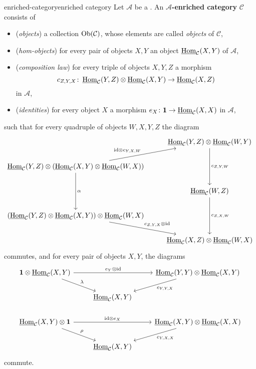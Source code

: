 \begin{topic}{enriched-category}{enriched category}
    Let $\mathcal{A}$ be a . An \textbf{$\mathcal{A}$-enriched category} $\mathcal{C}$ consists of
    \begin{itemize}
        \item (\textit{objects}) a collection $\textup{Ob}(\mathcal{C})$, whose elements are called \textit{objects} of $\mathcal{C}$,
        \item (\textit{hom-objects}) for every pair of objects $X, Y$ an object $\operatorname{\underline{Hom}}_\mathcal{C}(X, Y)$ of $\mathcal{A}$,
        \item (\textit{composition law}) for every triple of objects $X, Y, Z$ a morphism
        \[ c_{Z, Y, X} \colon \operatorname{\underline{Hom}}_\mathcal{C}(Y, Z) \otimes \operatorname{\underline{Hom}}_\mathcal{C}(X, Y) \to \operatorname{\underline{Hom}}_\mathcal{C}(X, Z) \]
        in $\mathcal{A}$,
        \item (\textit{identities}) for every object $X$ a morphism $e_X \colon \textbf{1} \to \operatorname{\underline{Hom}}_\mathcal{C}(X, X)$ in $\mathcal{A}$,
    \end{itemize}
    such that for every quadruple of objects $W, X, Y, Z$ the diagram
    \[ \svg \begin{tikzcd}
        & \iHom_\mathcal{C}(Y, Z) \otimes \iHom_\mathcal{C}(W, Y) \arrow{dd}{c_{Z, Y, W}} \\ \iHom_\mathcal{C}(Y, Z) \otimes \left(\iHom_\mathcal{C}(X, Y) \otimes \iHom_\mathcal{C}(W, X)\right) \arrow{ur}{\id \otimes c_{Y, X, W}} \arrow{dd}{\alpha} & \\ & \iHom_\mathcal{C}(W, Z) \arrow{dd}{c_{Z, X, W}} \\ \left(\iHom_\mathcal{C}(Y, Z) \otimes \iHom_\mathcal{C}(X, Y)\right) \otimes \iHom_\mathcal{C}(W, X) \arrow{dr}{c_{Z, Y, X} \otimes \id} & \\ & \iHom_\mathcal{C}(X, Z) \otimes \iHom_\mathcal{C}(W, X)
    \end{tikzcd} \]
    commutes, and for every pair of objects $X, Y$, the diagrams
    \[ \svg \begin{tikzcd}
        \textbf{1} \otimes \iHom_\mathcal{C}(X, Y) \arrow{rr}{e_Y \otimes \id} \arrow{dr}{\lambda} && \iHom_\mathcal{C}(Y, Y) \otimes \iHom_\mathcal{C}(X, Y) \arrow{dl}{c_{Y, Y, X}} \\ & \iHom_\mathcal{C}(X, Y) & \\
        \iHom_\mathcal{C}(X, Y) \otimes \textbf{1} \arrow{rr}{\id \otimes e_X} \arrow{dr}{\rho} && \iHom_\mathcal{C}(X, Y) \otimes \iHom_\mathcal{C}(X, X) \arrow{dl}{c_{Y, X, X}} \\ & \iHom_\mathcal{C}(X, Y) &       
    \end{tikzcd} \]
    commute.
\end{topic}

